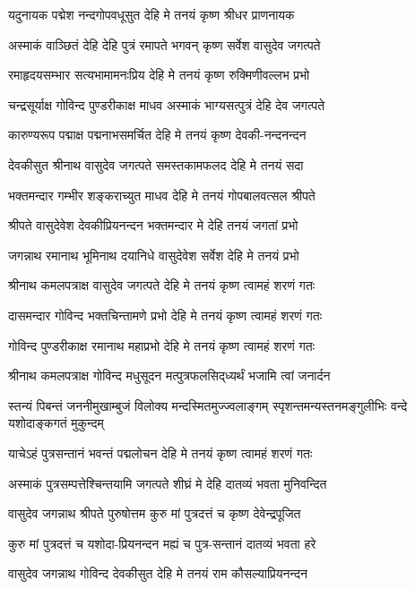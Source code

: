 \twolineshloka
{यदुनायक पद्मेश नन्दगोपवधूसुत}
{देहि मे तनयं कृष्ण श्रीधर प्राणनायक}%

\twolineshloka
{अस्माकं वाञ्छितं देहि देहि पुत्रं रमापते}
{भगवन् कृष्ण सर्वेश वासुदेव जगत्पते}%

\twolineshloka
{रमाहृदयसम्भार सत्यभामामनःप्रिय}
{देहि मे तनयं कृष्ण रुक्मिणीवल्लभ प्रभो}%

\twolineshloka
{चन्द्रसूर्याक्ष गोविन्द पुण्डरीकाक्ष माधव}
{अस्माकं भाग्यसत्पुत्रं देहि देव जगत्पते}%

\twolineshloka
{कारुण्यरूप पद्माक्ष पद्मनाभसमर्चित}
{देहि मे तनयं कृष्ण देवकी-नन्दनन्दन}%

\twolineshloka
{देवकीसुत श्रीनाथ वासुदेव जगत्पते}
{समस्तकामफलद देहि मे तनयं सदा}%

\twolineshloka
{भक्तमन्दार गम्भीर शङ्कराच्युत माधव}
{देहि मे तनयं गोपबालवत्सल श्रीपते}%

\twolineshloka
{श्रीपते वासुदेवेश देवकीप्रियनन्दन}
{भक्तमन्दार मे देहि तनयं जगतां प्रभो}%

\twolineshloka
{जगन्नाथ रमानाथ भूमिनाथ दयानिधे}
{वासुदेवेश सर्वेश देहि मे तनयं प्रभो}%

\twolineshloka
{श्रीनाथ कमलपत्राक्ष वासुदेव जगत्पते}
{देहि मे तनयं कृष्ण त्वामहं शरणं गतः}%

\twolineshloka
{दासमन्दार गोविन्द भक्तचिन्तामणे प्रभो}
{देहि मे तनयं कृष्ण त्वामहं शरणं गतः}%

\twolineshloka
{गोविन्द पुण्डरीकाक्ष रमानाथ महाप्रभो}
{देहि मे तनयं कृष्ण त्वामहं शरणं गतः}%

\twolineshloka
{श्रीनाथ कमलपत्राक्ष गोविन्द मधुसूदन}
{मत्पुत्रफलसिद्‌ध्यर्थं भजामि त्वां जनार्दन}%

\fourlineindentedshloka
{स्तन्यं पिबन्तं जननीमुखाम्बुजं}
{विलोक्य मन्दस्मितमुज्ज्वलाङ्गम्}
{स्पृशन्तमन्यस्तनमङ्गुलीभिः}
{वन्दे यशोदाङ्कगतं मुकुन्दम्}%

\twolineshloka
{याचेऽहं पुत्रसन्तानं भवन्तं पद्मलोचन}
{देहि मे तनयं कृष्ण त्वामहं शरणं गतः}%

\twolineshloka
{अस्माकं पुत्रसम्पत्तेश्चिन्तयामि जगत्पते}
{शीघ्रं मे देहि दातव्यं भवता मुनिवन्दित}%

\twolineshloka
{वासुदेव जगन्नाथ श्रीपते पुरुषोत्तम}
{कुरु मां पुत्रदत्तं च कृष्ण देवेन्द्रपूजित}%

\twolineshloka
{कुरु मां पुत्रदत्तं च यशोदा-प्रियनन्दन}
{मह्यं च पुत्र-सन्तानं दातव्यं भवता हरे}%

\twolineshloka
{वासुदेव जगन्नाथ गोविन्द देवकीसुत}
{देहि मे तनयं राम कौसल्याप्रियनन्दन}%

